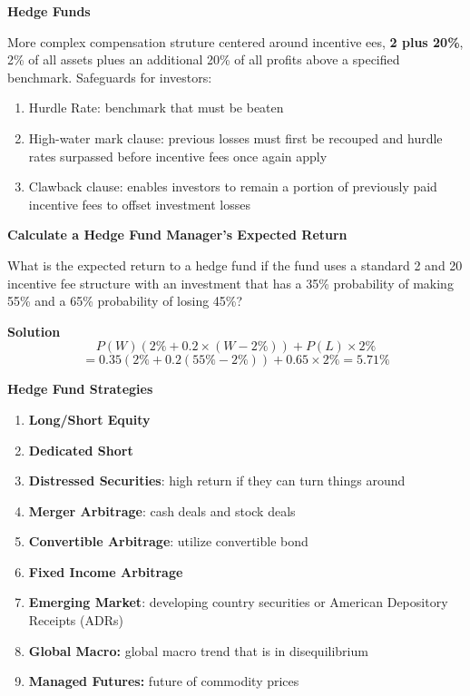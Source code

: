 \documentclass[11pt,fleqn]{book} %
\numberwithin{equation}{section} %
\numberwithin{figure}{section} %
\numberwithin{table}{section} %
\begin{document}
\begin{definition}\textbf{Hedge Funds}

More complex compensation struture centered around incentive ees, \textbf{2 plus 20\%}, 2\% of all assets plues an additional 20\% of all profits above a specified benchmark. Safeguards for investors:
\begin{enumerate}
    \item Hurdle Rate: benchmark that must be beaten
    \item High-water mark clause: previous losses must first be recouped and hurdle rates surpassed before incentive fees once again apply
    \item Clawback clause: enables investors to remain a portion of previously paid incentive fees to offset investment losses
\end{enumerate}
\end{definition}
\begin{exercise}\textbf{Calculate a Hedge Fund Manager's Expected Return}

What is the expected return to a hedge fund if the fund uses a standard 2 and 20
incentive fee structure with an investment that has a 35\% probability of making
55\% and a 65\% probability of losing 45\%?

\textbf{Solution}
$$
P(W)(2\%+0.2\times(W-2\%))+P(L)\times 2\%
$$
$$
=0.35(2\%+0.2(55\%-2\%))+0.65\times 2\%=5.71\%
$$
\end{exercise}

\begin{definition}\textbf{Hedge Fund Strategies}
\begin{enumerate}
    \item \textbf{Long/Short Equity}
    \item \textbf{Dedicated Short}
    \item \textbf{Distressed Securities}: high return if they can turn things around
    \item \textbf{Merger Arbitrage}: cash deals and stock deals
    \item \textbf{Convertible Arbitrage}: utilize convertible bond
    \item \textbf{Fixed Income Arbitrage}
    \item \textbf{Emerging Market}: developing country securities or American Depository Receipts (ADRs)
    \item \textbf{Global Macro:} global macro trend that is in disequilibrium
    \item \textbf{Managed Futures:} future of commodity prices
\end{enumerate}
\end{definition}
\end{document}
